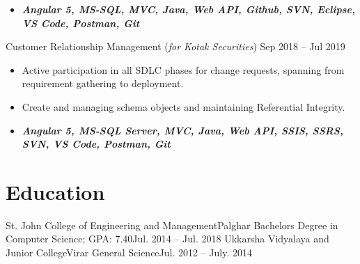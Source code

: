 \documentclass{resume}
\begin{document}
            \begin{itemize}[leftmargin=-0.15in, label={}]
                \item\textit{\textbf{\fontsize{10}{12}\selectfont 
                    Angular 5, MS-SQL, MVC, Java, Web API, Github, SVN, Eclipse, VS Code, Postman, Git
                }}
            \end{itemize}

        \projectTwoHead
        {Customer Relationship Management (\normalfont \textit{for Kotak Securities})}
        {Sep 2018 -- Jul 2019}
            \begin{itemize}[leftmargin=0in, label={-}]
                \item\small Active participation in all SDLC phases for change requests, spanning from requirement gathering to  deployment.
                \item\small Create and managing schema objects and maintaining Referential Integrity.
            \end{itemize}
    
            \begin{itemize}[leftmargin=-0.15in, label={}]
                \item\textit{\textbf{\fontsize{10}{12}\selectfont 
                    Angular 5, MS-SQL Server, MVC, Java, Web API, SSIS, SSRS, SVN, VS Code, Postman, Git
                }}
            \end{itemize}
    \resumeItemListEnd
    
    \resumeSubHeadingListEnd

\section{Education}
  \resumeSubHeadingListStart
    \resumeSubheading
      {St. John College of Engineering and Management}{Palghar}
      {Bachelors Degree in Computer Science;  GPA: 7.40}{Jul. 2014 -- Jul. 2018}
    \resumeSubheading
      {Ukkarsha Vidyalaya and Junior College}{Virar}
      {General Science}{Jul. 2012 -- July. 2014}
  \resumeSubHeadingListEnd



\end{document}
